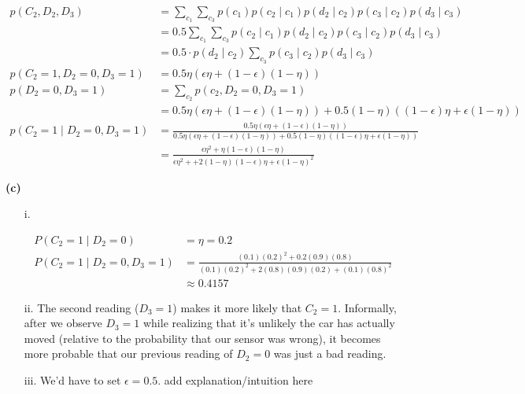 \documentclass[11pt]{article}
\begin{document}
\begin{align}
	p(C_2, D_2, D_3) 
		&= \sum_{c_1} \sum_{c_3} p(c_1) p(c_2 \mid c_1) p(d_2 \mid c_2) p(c_3 \mid c_2) p(d_3 \mid c_3) \\
		&= 0.5 \sum_{c_1} \sum_{c_3} p(c_2 \mid c_1)  p(d_2 \mid c_2) p(c_3 \mid c_2) p(d_3 \mid c_3) \\
		&= 0.5 \cdot p(d_2 \mid c_2)  \sum_{c_3}  p(c_3 \mid c_2) p(d_3 \mid c_3) \\
	p(C_2=1, D_2=0, D_3=1)
		&= 0.5 \eta \left(
			\epsilon \eta + (1 - \epsilon) (1 - \eta)
		\right) \\
	p(D_2=0, D_3=1)
		&= \sum_{c_2} p(c_2, D_2=0, D_3=1) \\
		&= 0.5 \eta \left(
		\epsilon \eta + (1 - \epsilon) (1 - \eta)
		\right) + 0.5 (1 - \eta) \left(
			(1 - \epsilon) \eta + \epsilon (1 - \eta)
		\right)\\
	p(C_2=1 \mid D_2=0, D_3=1)
		&= \frac{0.5 \eta \left(
			\epsilon \eta + (1 - \epsilon) (1 - \eta)
			\right)}{0.5 \eta \left(
		\epsilon \eta + (1 - \epsilon) (1 - \eta)
	\right) + 0.5 (1 - \eta) \left(
(1 - \epsilon) \eta + \epsilon (1 - \eta)
\right)} \\
		&= \frac{\epsilon \eta^2 + \eta (1  - \epsilon) (1 - \eta)
		}{
			\epsilon \eta^2 +
			+2 (1-\eta)(1- \epsilon) \eta + \epsilon(1 - \eta)^2 
		}
\end{align}


\clearpage
\textbf{(c)}

\begin{itemize}
	\item[i.] 
	
	\begin{align}
		P(C_2=1 \mid D_2=0)
			&= \eta = 0.2 \\
		P(C_2 = 1 \mid D_2=0, D_3=1)
			&= \frac{
					(0.1) (0.2)^2 + 0.2 (0.9)(0.8)
			}{
			(0.1) (0.2)^2 + 2 (0.8)(0.9)(0.2) + (0.1)(0.8)^2
		}\\
	&\approx 0.4157
	\end{align}
	
	\item[ii.] The second reading ($D_3=1$) makes it more likely that $C_2=1$. Informally, after we observe $D_3=1$ while realizing that it's unlikely the car has actually moved (relative to the probability that our sensor was wrong), it becomes more probable that our previous reading of $D_2=0$ was just a bad reading. 
	
	
	\item[iii.] We'd have to set $\epsilon = 0.5$.  add explanation/intuition here
\end{itemize}
\end{document}
